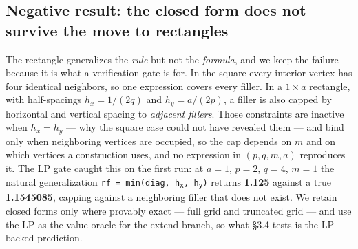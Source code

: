 \documentclass[11pt]{article}
\begin{document}
\subsection{Negative result: the closed form does not survive the move to rectangles}

The rectangle generalizes the \textit{rule} but not the \textit{formula}, and we keep the failure because it
is what a verification gate is for. In the square every interior vertex has four identical
neighbors, so one expression covers every filler. In a $1 \times a$ rectangle, with half-spacings
$h_x = 1/(2q)$ and $h_y = a/(2p)$, a filler is also capped by horizontal and vertical spacing to
\textit{adjacent fillers}. Those constraints are inactive when $h_x = h_y$ --- why the square case could not
have revealed them --- and bind only when neighboring vertices are occupied, so the cap depends
on $m$ and on which vertices a construction uses, and no expression in $(p, q, m, a)$ reproduces
it. The LP gate caught this on the first run: at $a = 1$, $p = 2$, $q = 4$, $m = 1$ the natural
generalization \texttt{rf = min(diag, h\textsubscript{x}, h\textsubscript{y})} returns \textbf{1.125} against a true \textbf{1.1545085}, capping
against a neighboring filler that does not exist. We retain closed forms only where provably
exact --- full grid and truncated grid --- and use the LP as the value oracle for the extend branch,
so what \S3.4 tests is the LP-backed prediction.
\end{document}
